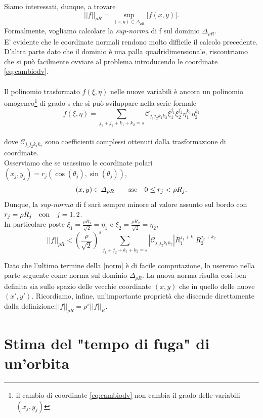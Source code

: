 \documentclass[a4paper,11pt,titlepage]{report}
\theoremstyle{definition}
\theoremstyle{plain}
\begin{document}
Siamo interessati, dunque, a trovare $$||f||_{\rho R} = \sup_{ (x,y) \in \varDelta_{\rho R}} |f(x,y)|. $$ Formalmente, vogliamo calcolare la \textit{sup-norma} di f sul dominio $\varDelta_{\rho R}$.
\\E' evidente che le coordinate normali rendono molto difficile il calcolo precedente. \\D'altra parte dato che il dominio è una palla quadridimensionale, riscontriamo che si può facilmente ovviare al problema introducendo le coordinate \ref{eq:cambiodv}.
\\\\Il polinomio trasformato $f(\xi,\eta)$ nelle nuove variabili è ancora un polinomio omogeneo\footnote{il cambio di coordinate \ref{eq:cambiodv} non cambia il grado delle variabili $(x_j,y_j)$} di grado s che si può sviluppare nella serie formale $$ f(\xi,\eta)= \sum_{j_1+j_2+k_1+k_2=s} \mathcal{C}_{j_1j_2k_1k_2} \xi_1^{j_1}\xi_2^{j_2}\eta_1^{k_1}\eta_2^{k_2} $$
\\dove $\mathcal{C}_{j_1j_2k_1k_2}$ sono coefficienti complessi ottenuti dalla trasformazione di coordinate.
\\Osserviamo che se usassimo le coordinate polari $(x_j,y_j)=r_j(\cos(\theta_j),\sin(\theta_j))$, $$ (x,y) \in \varDelta_{\rho R } \qquad  \hbox{sse} \quad  0 \leq r_j < \rho R_j. $$
Dunque, la \textit{sup-norma} di f sarà sempre minore al valore assunto sul bordo con $r_j= \rho R_j \quad \hbox{con} \quad j=1,2$.
\\In particolare poste $\xi_1=  \frac{\rho R_1}{\sqrt{2}} = \eta_1 $ e $\xi_2=  \frac{\rho R_2}{\sqrt{2}} = \eta_2$,
\begin{equation}
\label{norm}
||f||_{\rho R} < (\frac{\rho}{\sqrt{2}})^s \sum_{j_1+j_2+k_1+k_2=s} |\mathcal{C}_{j_1j_2k_1k_2}| R_1^{j_1+k_1}R_2^{j_2+k_2}
\end{equation}

Dato che l'ultimo termine della \ref{norm} è di facile computazione, lo useremo nella parte seguente come norma sul dominio $\varDelta_{\rho R}$.
La nuova norma risulta così ben definita sia sullo spazio delle vecchie coordinate $(x,y)$ che in quello delle nuove $(x',y')$.
Ricordiamo, infine, un'importante proprietà che discende direttamente dalla definizione:$||f||_{\rho R} = \rho^s ||f||_R$.

\section{Stima del "tempo di fuga" di un'orbita}
\end{document}
